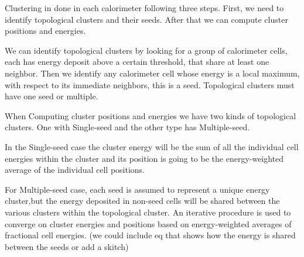 Clustering in done in each calorimeter following three steps.
First, we need to identify topological clusters and their seeds. After that we can compute cluster positions and energies.

We can identify topological clusters by looking for a group of calorimeter cells, each has energy deposit above a certain threshold, that share at least one neighbor.
Then we identify any calorimeter cell whose energy is a local maximum, with respect to its immediate neighbors, this is a seed.
Topological clusters must have one seed or multiple.

When Computing cluster positions and energies we have two kinds of topological clusters.
One with Single-seed and the other type has Multiple-seed.

In the Single-seed case the cluster energy will be the sum of all the individual cell energies within the cluster and its position is going to be the energy-weighted average of the individual cell positions.

For Multiple-seed case, each seed is assumed to represent a unique energy cluster,but the energy deposited in non-seed cells will be shared between the various clusters within the topological cluster.
An iterative procedure is used to converge on cluster energies and positions based on energy-weighted averages of fractional cell energies.
(we could include eq that shows how the energy is shared between the seeds or add a skitch)






